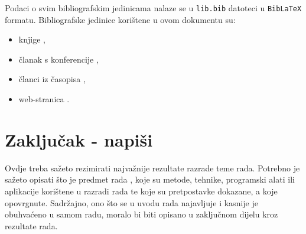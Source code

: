 \documentclass[]{foi}
\begin{document}
Podaci o svim bibliografskim jedinicama nalaze se u \texttt{lib.bib} datoteci u \texttt{BibLaTeX} formatu. Bibliografske jedinice korištene u ovom dokumentu su:
\begin{itemize}
    \item knjige \cite{russell2022ArtificialIntelligenceModern,wooldridge2009IntroductionMultiAgentSystems,oraictolic2011AkademskoPismoStrategije},
    \item članak s konferencije \cite{okresaduric2019ModellingFormingTemporary},
    \item članci iz časopisa \cite{SchattenEtAl2016roadmap,rincon2017InfluencingPeopleSocial},
    \item web-stranica \cite{copeland2020ArtificialIntelligence}.
\end{itemize}






\chapter{Zaključak - napiši}

Ovdje treba sažeto rezimirati najvažnije rezultate razrade teme rada. Potrebno je sažeto opisati što je predmet rada \cite{copeland2020ArtificialIntelligence}, koje su metode, tehnike, programski alati ili aplikacije korištene u razradi rada te koje su pretpostavke dokazane, a koje opovrgnute. Sadržajno, ono što se u uvodu rada najavljuje i kasnije je obuhvaćeno u samom radu, moralo bi biti opisano u zaključnom dijelu kroz rezultate rada. 


\makebackmatter
\end{document}
